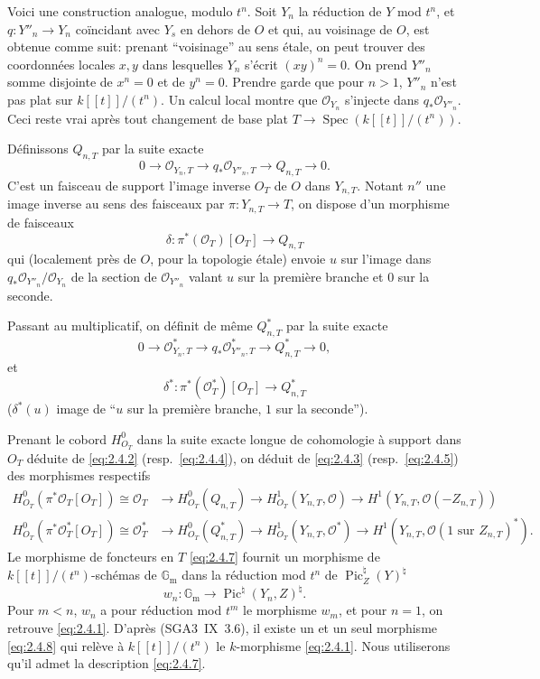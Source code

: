 \documentclass[12pt,a4paper]{article}
\theoremstyle{plain}
\theoremstyle{definition}
\theoremstyle{remark}
\DeclareMathOperator{\Spec}{Spec}
\DeclareMathOperator{\Pic}{Pic}
\newcommand{\OO}{\mathcal{O}}
\newcommand{\Gm}{\mathbb{G}_{\mathrm{m}}}
\providecommand{\Gm}{\mathbb{G}_{\mathrm m}}
\providecommand{\Spec}{\operatorname{Spec}}
\begin{document}
Voici une construction analogue, modulo $t^n$. Soit $Y_n$ la réduction de $Y$ mod $t^n$,
et $q:Y''_n\to Y_n$ coïncidant avec $Y_s$ en dehors de $O$ et qui, au voisinage de $O$, est
obtenue comme suit: prenant ``voisinage'' au sens étale, on peut trouver des
coordonnées locales $x,y$ dans lesquelles $Y_n$ s'écrit $(xy)^n=0$. On prend $Y''_n$
somme disjointe de $x^n=0$ et de $y^n=0$. Prendre garde que pour $n>1$, $Y''_n$ n'est pas plat
sur $k[[t]]/(t^n)$. Un calcul local montre que $\OO_{Y_n}$ s'injecte dans $q_*\OO_{Y''_n}$.
Ceci reste vrai après tout changement de base plat
$T\to\Spec(k[[t]]/(t^n))$.

Définissons $Q_{n,T}$ par la suite exacte
\begin{equation}\label{eq:2.4.2}
0\to\OO_{Y_n,T}\to q_*\OO_{Y''_n,T}\to Q_{n,T}\to 0.
\end{equation}
C'est un faisceau de support l'image inverse $O_T$ de $O$ dans $Y_{n,T}$. Notant $n''$
une image inverse au sens des faisceaux par $\pi:Y_{n,T}\to T$, on dispose d'un morphisme
de faisceaux
\begin{equation}\label{eq:2.4.3}
\delta:\pi^*(\OO_T)[O_T]\to Q_{n,T}
\end{equation}
qui (localement près de $O$, pour la topologie étale) envoie $u$ sur l'image dans
$q_*\OO_{Y''_n}/\OO_{Y_n}$ de la section de $\OO_{Y''_n}$ valant $u$ sur la première branche et $0$ sur
la seconde.

Passant au multiplicatif, on définit de même $Q^*_{n,T}$ par la suite exacte
\begin{equation}\label{eq:2.4.4}
0\to\OO^*_{Y_n,T}\to q_*\OO^*_{Y''_n,T}\to Q^*_{n,T}\to 0,
\end{equation}
et
\begin{equation}\label{eq:2.4.5}
\delta^*:\pi^*(\OO_T^*)[O_T]\to Q^*_{n,T}
\end{equation}
($\delta^*(u)$ image de ``$u$ sur la première branche, $1$ sur la seconde'').

Prenant le cobord $H^0_{O_T}$ dans la suite exacte longue de cohomologie à
support dans $O_T$ déduite de \eqref{eq:2.4.2} (resp.~\eqref{eq:2.4.4}), on déduit de
\eqref{eq:2.4.3} (resp.~\eqref{eq:2.4.5}) des morphismes respectifs
\begin{align}
H^0_{O_T}(\pi^*\OO_T[O_T])\cong\OO_T &\to H^0_{O_T}(Q_{n,T})\to H^1_{O_T}(Y_{n,T},\OO)\to H^1(Y_{n,T},\OO(-Z_{n,T}))\label{eq:2.4.6}\\
H^0_{O_T}(\pi^*\OO^*_T[O_T])\cong\OO^*_T &\to H^0_{O_T}(Q^*_{n,T})\to H^1_{O_T}(Y_{n,T},\OO^*)\to H^1(Y_{n,T},\OO(\text{1 sur }Z_{n,T})^*).\label{eq:2.4.7}
\end{align}
Le morphisme de foncteurs en $T$ \eqref{eq:2.4.7} fournit un morphisme de
$k[[t]]/(t^n)$-schémas de $\Gm$ dans la réduction mod $t^n$ de $\Pic_Z^\natural(Y)^\natural$
\begin{equation}\label{eq:2.4.8}
w_n:\Gm\to\Pic^\natural(Y_n,Z)^\natural.
\end{equation}
Pour $m<n$, $w_n$ a pour réduction mod $t^m$ le morphisme $w_m$, et pour $n=1$, on
retrouve \eqref{eq:2.4.1}. D'après (SGA3~IX~3.6), il existe un et un seul morphisme
\eqref{eq:2.4.8} qui relève à $k[[t]]/(t^n)$ le $k$-morphisme \eqref{eq:2.4.1}. Nous
utiliserons qu'il admet la description \eqref{eq:2.4.7}.
\end{document}
